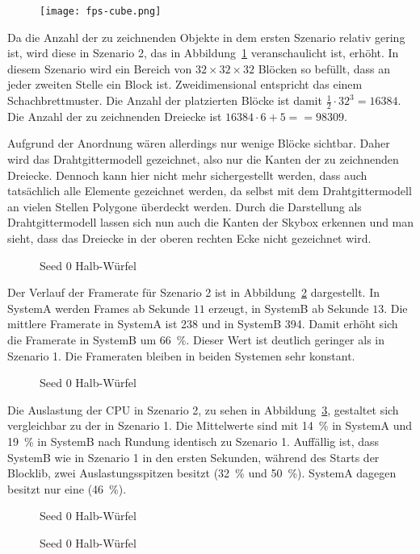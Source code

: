 \begin{figure}
	\centering
	\texttt{[image: fps-cube.png]}
	\caption{}\label{fig:cube}
\end{figure}
Da die Anzahl der zu zeichnenden Objekte in dem ersten Szenario relativ gering ist, wird diese in Szenario 2, das in Abbildung~\ref{fig:cube} veranschaulicht ist, erhöht. In diesem Szenario wird ein Bereich von $32 \times 32 \times 32$ Blöcken so befüllt, dass an jeder zweiten Stelle ein Block ist. Zweidimensional entspricht das einem Schachbrettmuster. Die Anzahl der platzierten Blöcke ist damit $\frac{1}{2}\cdot32^3 = 16384$. Die Anzahl der zu zeichnenden Dreiecke ist $16384\cdot6 + 5= = 98309$.

Aufgrund der Anordnung wären allerdings nur wenige Blöcke sichtbar. Daher wird das Drahtgittermodell gezeichnet, also nur die Kanten der zu zeichnenden Dreiecke. Dennoch kann hier nicht mehr sichergestellt werden, dass auch tatsächlich alle Elemente gezeichnet werden, da selbst mit dem Drahtgittermodell an vielen Stellen Polygone überdeckt werden. Durch die Darstellung als Drahtgittermodell lassen sich nun auch die Kanten der Skybox erkennen und man sieht, dass das Dreiecke in der oberen rechten Ecke nicht gezeichnet wird. 

\begin{figure}[!htb]
	\caption{Seed 0 Halb-Würfel}\label{fig:seed-0-cube-fps}
\end{figure}
Der Verlauf der Framerate für Szenario 2 ist in Abbildung~\ref{fig:seed-0-cube-fps} dargestellt. In SystemA werden Frames ab Sekunde $11$ erzeugt, in SystemB ab Sekunde $13$. Die mittlere Framerate in SystemA ist \SI{238}{\fps} und in SystemB \SI{394}{\fps}. Damit erhöht sich die Framerate in SystemB um \SI{66}{\percent}. Dieser Wert ist deutlich geringer als in Szenario 1. Die Frameraten bleiben in beiden Systemen sehr konstant.

\begin{figure}[!htb]
	\caption{Seed 0 Halb-Würfel}\label{fig:seed-0-cube-cpu}
\end{figure}
Die Auslastung der CPU in Szenario 2, zu sehen in Abbildung~\ref{fig:seed-0-cube-cpu}, gestaltet sich vergleichbar zu der in Szenario 1. Die Mittelwerte sind mit \SI{14}{\percent} in SystemA und \SI{19}{\percent} in SystemB nach Rundung identisch zu Szenario 1.
Auffällig ist, dass SystemB wie in Szenario 1 in den ersten Sekunden, während des Starts der Blocklib, zwei Auslastungsspitzen besitzt (\SI{32}{\percent} und \SI{50}{\percent}). SystemA dagegen besitzt nur eine (\SI{46}{\percent}).

\begin{figure}[!htb]
	\caption{Seed 0 Halb-Würfel}\label{fig:seed-0-cube-gpu}
\end{figure}

\begin{figure}[!htb]
	\caption{Seed 0 Halb-Würfel}\label{fig:seed-0-cube-mem}
\end{figure} 
